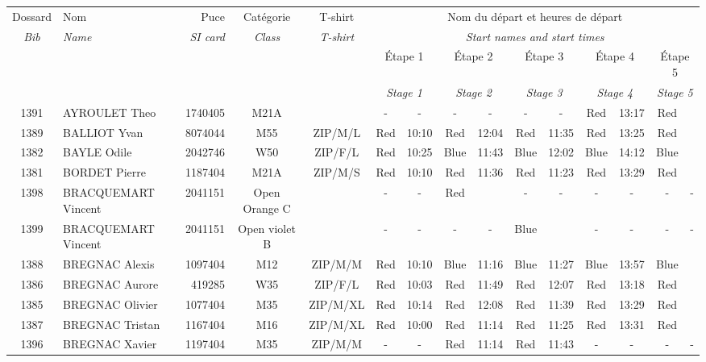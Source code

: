 \documentclass{report}
\begin{document}
  \begin{longtable}{|c|l|r|c|c|*{5}{cc|}}
    Dossard & Nom  & Puce    & Catégorie & T-shirt & \multicolumn{10}{c|}{Nom du départ et heures de départ} \\
    \itshape Bib     & \itshape Name & \itshape SI card & \itshape Class  & \itshape  T-shirt  & \multicolumn{10}{c|}{\itshape Start names and start times} \\
    \hline
    & & & & & \multicolumn{2}{c|}{Étape 1} & \multicolumn{2}{c|}{Étape 2} & \multicolumn{2}{c|}{Étape 3} & \multicolumn{2}{c|}{Étape 4} & \multicolumn{2}{c|}{Étape 5} \\
    & & & & & \multicolumn{2}{c|}{\itshape Stage 1} & \multicolumn{2}{c|}{\itshape Stage 2} & \multicolumn{2}{c|}{\itshape Stage 3} & \multicolumn{2}{c|}{\itshape Stage 4} & \multicolumn{2}{c|}{\itshape Stage 5} \\
    \hline
    1391 & AYROULET Theo & 1740405 & M21A &   & - &  - & - &  - & - &  - & Red & 13:17 & Red &  \\
    1389 & BALLIOT Yvan & 8074044 & M55 & ZIP/M/L & Red & 10:10 & Red & 12:04 & Red & 11:35 & Red & 13:25 & Red &  \\
    1382 & BAYLE Odile & 2042746 & W50 & ZIP/F/L & Red & 10:25 & Blue & 11:43 & Blue & 12:02 & Blue & 14:12 & Blue &  \\
    1381 & BORDET Pierre & 1187404 & M21A & ZIP/M/S & Red & 10:10 & Red & 11:36 & Red & 11:23 & Red & 13:29 & Red &  \\
    1398 & BRACQUEMART Vincent & 2041151 & Open Orange C &   & - &  - & Red &   & - &  - & - &  - & - &  -\\
    1399 & BRACQUEMART Vincent & 2041151 & Open violet B &   & - &  - & - &  - & Blue &   & - &  - & - &  -\\
    1388 & BREGNAC Alexis & 1097404 & M12 & ZIP/M/M & Red & 10:10 & Blue & 11:16 & Blue & 11:27 & Blue & 13:57 & Blue &  \\
    1386 & BREGNAC Aurore & 419285 & W35 & ZIP/F/L & Red & 10:03 & Red & 11:49 & Red & 12:07 & Red & 13:18 & Red &  \\
    1385 & BREGNAC Olivier & 1077404 & M35 & ZIP/M/XL & Red & 10:14 & Red & 12:08 & Red & 11:39 & Red & 13:29 & Red &  \\
    1387 & BREGNAC Tristan & 1167404 & M16 & ZIP/M/XL & Red & 10:00 & Red & 11:14 & Red & 11:25 & Red & 13:31 & Red &  \\
    1396 & BREGNAC Xavier & 1197404 & M35 & ZIP/M/M & - &  - & Red & 11:14 & Red & 11:43 & - &  - & - &  -\\

\end{longtable}
\end{document}
